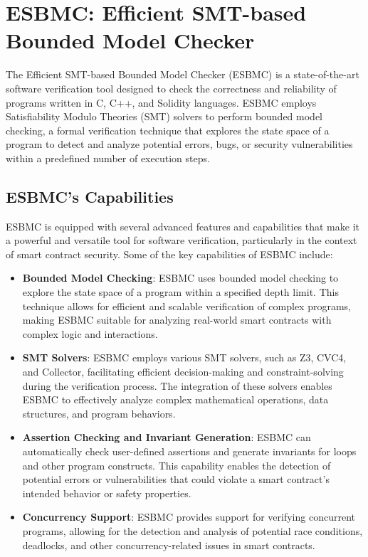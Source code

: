 \section{ESBMC: Efficient SMT-based Bounded Model Checker}

The Efficient SMT-based Bounded Model Checker (ESBMC) is a state-of-the-art software verification tool designed to check the correctness and reliability of programs written in C, C++, and Solidity languages. ESBMC employs Satisfiability Modulo Theories (SMT) solvers to perform bounded model checking, a formal verification technique that explores the state space of a program to detect and analyze potential errors, bugs, or security vulnerabilities within a predefined number of execution steps.

\subsection{ESBMC's Capabilities}

ESBMC is equipped with several advanced features and capabilities that make it a powerful and versatile tool for software verification, particularly in the context of smart contract security. Some of the key capabilities of ESBMC include:

\begin{itemize}

\item \textbf{Bounded Model Checking}: ESBMC uses bounded model checking to explore the state space of a program within a specified depth limit. This technique allows for efficient and scalable verification of complex programs, making ESBMC suitable for analyzing real-world smart contracts with complex logic and interactions.

\item \textbf{SMT Solvers}: ESBMC employs various SMT solvers, such as Z3, CVC4, and Collector, facilitating efficient decision-making and constraint-solving during the verification process. The integration of these solvers enables ESBMC to effectively analyze complex mathematical operations, data structures, and program behaviors.

\item \textbf{Assertion Checking and Invariant Generation}: ESBMC can automatically check user-defined assertions and generate invariants for loops and other program constructs. This capability enables the detection of potential errors or vulnerabilities that could violate a smart contract's intended behavior or safety properties.

\item \textbf{Concurrency Support}: ESBMC provides support for verifying concurrent programs, allowing for the detection and analysis of potential race conditions, deadlocks, and other concurrency-related issues in smart contracts.

\end{itemize}

